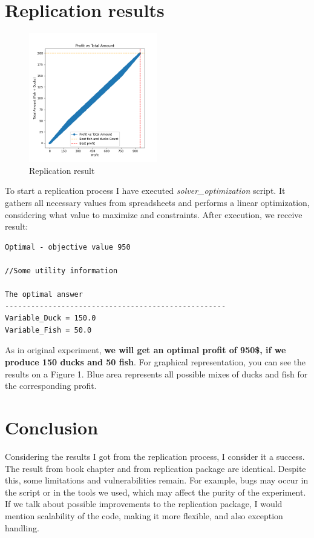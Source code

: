 \documentclass[sigconf, nonacm]{acmart}
\begin{document}
\section{Replication results}
\begin{figure}
  \centering
  \includegraphics[width=0.5\textwidth]{figures/result_plot.png} 
  \caption{Replication result}
  \label{fig:yourlabel}
\end{figure}
 To start a replication process I have executed \textit{solver\_optimization} script. It gathers all necessary values from spreadsheets and performs a linear optimization, considering what value to maximize and constraints. After execution, we receive result:
\begin{verbatim}
Optimal - objective value 950

//Some utility information

The optimal answer
---------------------------------------------------
Variable_Duck = 150.0
Variable_Fish = 50.0
\end{verbatim}
As in original experiment, \textbf{we will get an optimal profit of 950\$, if we produce 150 ducks and 50 fish}. For graphical representation, you can see the results on a Figure 1. Blue area represents all possible mixes of ducks and fish for the corresponding profit.

\section{Conclusion}
Considering the results I got from the replication process, I consider it a success. The result from book chapter and from replication package are identical. 
Despite this, some limitations and vulnerabilities remain. For example, bugs may occur in the script or in the tools we used, which may affect the purity of the experiment. If we talk about possible improvements to the replication package, I would mention scalability of the code, making it more flexible, and also exception handling.




\end{document}
